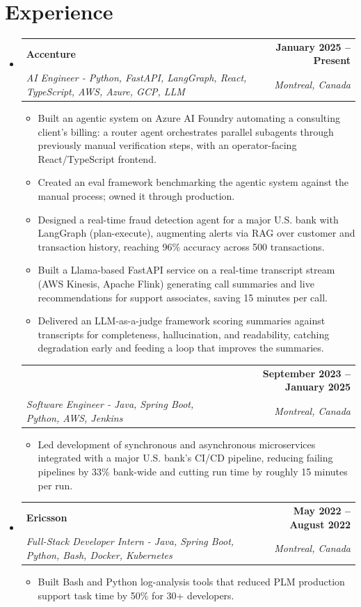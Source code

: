 \documentclass[letterpaper,11pt]{article}
\makeatletter
\newcommand{\resumeItem}[1]{
  \item\small{{#1 \vspace{-2pt}}}
}
\newcommand{\resumeSubheading}[4]{
  \vspace{-2pt}\item
    \begin{tabular*}{1.0\textwidth}[t]{l@{\extracolsep{\fill}}r}
      \textbf{#1} & \textbf{\small #2} \\
      \textit{\small#3} & \textit{\small #4} \\
    \end{tabular*}\vspace{-7pt}
}
\newcommand{\resumeSubheadingContinued}[3]{
  \vspace{4pt}
    \begin{tabular*}{1.0\textwidth}[t]{l@{\extracolsep{\fill}}r}
      & \textbf{\small #2} \\
      \textit{\small#1} & \textit{\small #3} \\
    \end{tabular*}\vspace{-7pt}
}
\newcommand{\resumeSubHeadingListStart}{\begin{itemize}[leftmargin=0.0in, label={}]}
\newcommand{\resumeSubHeadingListEnd}{\end{itemize}}
\newcommand{\resumeItemListStart}{\begin{itemize}}
\newcommand{\resumeItemListEnd}{\end{itemize}\vspace{-5pt}}
\makeatother
\begin{document}
\section{Experience}
  \resumeSubHeadingListStart

    \resumeSubheading
      {Accenture}{January 2025 -- Present}
      {AI Engineer - Python, FastAPI, LangGraph, React, TypeScript, AWS, Azure, GCP, LLM}{Montreal, Canada}
      \resumeItemListStart
        \resumeItem{Built an agentic system on Azure AI Foundry automating a consulting client's billing: a router agent orchestrates parallel subagents through previously manual verification steps, with an operator-facing React/TypeScript frontend.}
        \resumeItem{Created an eval framework benchmarking the agentic system against the manual process; owned it through production.}
        \resumeItem{Designed a real-time fraud detection agent for a major U.S. bank with LangGraph (plan-execute), augmenting alerts via RAG over customer and transaction history, reaching 96\% accuracy across 500 transactions.}
        \resumeItem{Built a Llama-based FastAPI service on a real-time transcript stream (AWS Kinesis, Apache Flink) generating call summaries and live recommendations for support associates, saving 15 minutes per call.}
        \resumeItem{Delivered an LLM-as-a-judge framework scoring summaries against transcripts for completeness, hallucination, and readability, catching degradation early and feeding a loop that improves the summaries.}
      \resumeItemListEnd
      \vspace{-8pt}

    \resumeSubheadingContinued
      {Software Engineer - Java, Spring Boot, Python, AWS, Jenkins}{September 2023 -- January 2025}{Montreal, Canada}
      \resumeItemListStart
        \resumeItem{Led development of synchronous and asynchronous microservices integrated with a major U.S. bank's CI/CD pipeline, reducing failing pipelines by 33\% bank-wide and cutting run time by roughly 15 minutes per run.}
      \resumeItemListEnd

    \resumeSubheading
      {Ericsson}{May 2022 -- August 2022}
      {Full-Stack Developer Intern - Java, Spring Boot, Python, Bash, Docker, Kubernetes}{Montreal, Canada}
      \resumeItemListStart
        \resumeItem{Built Bash and Python log-analysis tools that reduced PLM production support task time by 50\% for 30+ developers.}
      \resumeItemListEnd

  \resumeSubHeadingListEnd
\vspace{-14pt}
\end{document}
